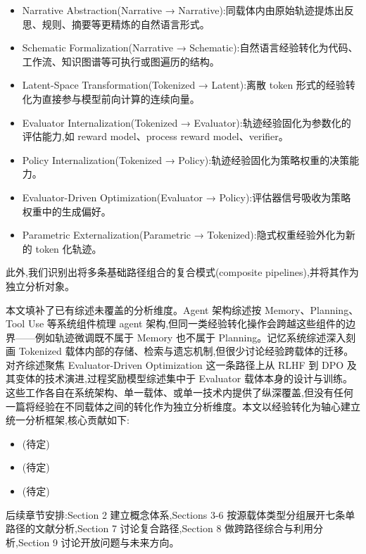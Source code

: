 \begin{itemize}
\item Narrative Abstraction(Narrative → Narrative):同载体内由原始轨迹提炼出反思、规则、摘要等更精炼的自然语言形式。
\item Schematic Formalization(Narrative → Schematic):自然语言经验转化为代码、工作流、知识图谱等可执行或图遍历的结构。
\item Latent-Space Transformation(Tokenized → Latent):离散 token 形式的经验转化为直接参与模型前向计算的连续向量。
\item Evaluator Internalization(Tokenized → Evaluator):轨迹经验固化为参数化的评估能力,如 reward model、process reward model、verifier。
\item Policy Internalization(Tokenized → Policy):轨迹经验固化为策略权重的决策能力。
\item Evaluator-Driven Optimization(Evaluator → Policy):评估器信号吸收为策略权重中的生成偏好。
\item Parametric Externalization(Parametric → Tokenized):隐式权重经验外化为新的 token 化轨迹。

\end{itemize}
此外,我们识别出将多条基础路径组合的复合模式(composite pipelines),并将其作为独立分析对象。

本文填补了已有综述未覆盖的分析维度。Agent 架构综述按 Memory、Planning、Tool Use 等系统组件梳理 agent 架构,但同一类经验转化操作会跨越这些组件的边界——例如轨迹微调既不属于 Memory 也不属于 Planning。记忆系统综述深入刻画 Tokenized 载体内部的存储、检索与遗忘机制,但很少讨论经验跨载体的迁移。对齐综述聚焦 Evaluator-Driven Optimization 这一条路径上从 RLHF 到 DPO 及其变体的技术演进,过程奖励模型综述集中于 Evaluator 载体本身的设计与训练。这些工作各自在系统架构、单一载体、或单一技术内提供了纵深覆盖,但没有任何一篇将经验在不同载体之间的转化作为独立分析维度。本文以经验转化为轴心建立统一分析框架,核心贡献如下:

\begin{itemize}
\item (待定)
\item (待定)
\item (待定)

\end{itemize}
后续章节安排:Section 2 建立概念体系,Sections 3-6 按源载体类型分组展开七条单路径的文献分析,Section 7 讨论复合路径,Section 8 做跨路径综合与利用分析,Section 9 讨论开放问题与未来方向。
